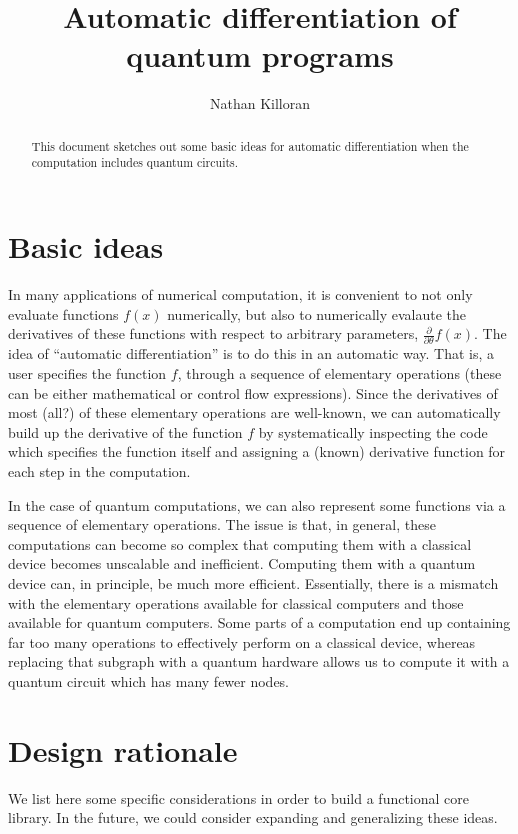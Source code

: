 \documentclass[a4paper,10pt]{article}
\title{Automatic differentiation of quantum programs}
\author{Nathan Killoran}
\begin{document}
\maketitle

\begin{abstract}
This document sketches out some basic ideas for automatic differentiation when the computation includes quantum circuits.
\end{abstract}

\section{Basic ideas}
In many applications of numerical computation, it is convenient to not only evaluate functions $f(x)$ numerically, but also to numerically evalaute the derivatives of these functions with respect to arbitrary parameters, $\frac{\partial}{\partial\theta}f(x)$.
The idea of ``automatic differentiation'' is to do this in an automatic way. That is, a user specifies the function $f$, through a sequence of elementary operations (these can be either mathematical or control flow expressions). Since the derivatives of most (all?) of these elementary operations are well-known, we can automatically build up the derivative of the function $f$ by systematically inspecting the code which specifies the function itself and assigning a (known) derivative function for each step in the computation.

In the case of quantum computations, we can also represent some functions via a sequence of elementary operations. The issue is that, in general, these computations can become so complex that computing them with a classical device becomes unscalable and inefficient. Computing them with a quantum device can, in principle, be much more efficient. Essentially, there is a mismatch with the elementary operations available for classical computers and those available for quantum computers. Some parts of a computation end up containing far too many operations to effectively perform on a classical device, whereas replacing that subgraph with a quantum hardware allows us to compute it with a quantum circuit which has many fewer nodes. 

\section{Design rationale}

We list here some specific considerations in order to build a functional core library. In the future, we could consider expanding and generalizing these ideas.
\end{document}
